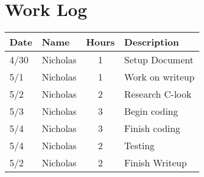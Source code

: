 \documentclass[letterpaper,10pt,fleqn,draftclsnofoot,onecolumn]{IEEEtran}
\begin{document}
	\section*{Work Log}
	\begin{tabular}{l l c p{1.1in}}\textbf{Date} & \textbf{Name} & \textbf{Hours} & \textbf{Description}\\\hline
		4/30 & Nicholas & 1 & Setup Document\\\hline
		5/1 & Nicholas & 1 & Work on writeup\\\hline
		5/2 & Nicholas & 2 & Research C-look\\\hline
		5/3 & Nicholas & 3 & Begin coding\\\hline
		5/4 & Nicholas & 3 & Finish coding\\\hline
		5/4 & Nicholas & 2 & Testing\\\hline
		5/2 & Nicholas & 2 & Finish Writeup\\\hline
	\end{tabular}
		
	
\end{document}
